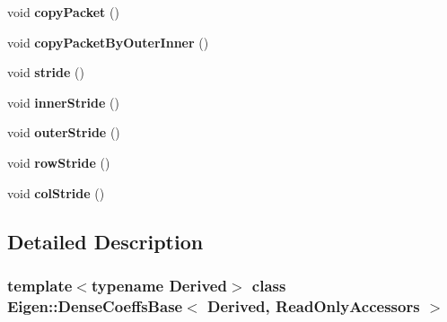 \begin{DoxyCompactItemize}
void {\bfseries copy\+Packet} ()
\item 
\mbox{\label{class_eigen_1_1_dense_coeffs_base_3_01_derived_00_01_read_only_accessors_01_4_adc157a322db2e4d4ab9657c9604cbf11}} 
void {\bfseries copy\+Packet\+By\+Outer\+Inner} ()
\item 
\mbox{\label{class_eigen_1_1_dense_coeffs_base_3_01_derived_00_01_read_only_accessors_01_4_a4105f95049fb46e76c3ef7d5235fbe19}} 
void {\bfseries stride} ()
\item 
\mbox{\label{class_eigen_1_1_dense_coeffs_base_3_01_derived_00_01_read_only_accessors_01_4_abed12aefb9b2e8e1c70e9c388adba481}} 
void {\bfseries inner\+Stride} ()
\item 
\mbox{\label{class_eigen_1_1_dense_coeffs_base_3_01_derived_00_01_read_only_accessors_01_4_a3042f0d7b82fa16ab993f266d09745e0}} 
void {\bfseries outer\+Stride} ()
\item 
\mbox{\label{class_eigen_1_1_dense_coeffs_base_3_01_derived_00_01_read_only_accessors_01_4_a5a331419022ccf26cede98cff8b83dfc}} 
void {\bfseries row\+Stride} ()
\item 
\mbox{\label{class_eigen_1_1_dense_coeffs_base_3_01_derived_00_01_read_only_accessors_01_4_ad26de0024e88bdc5aa7b94c7871c6cd6}} 
void {\bfseries col\+Stride} ()
\end{DoxyCompactItemize}


\subsection{Detailed Description}
\subsubsection*{template$<$typename Derived$>$\newline
class Eigen\+::\+Dense\+Coeffs\+Base$<$ Derived, Read\+Only\+Accessors $>$}

